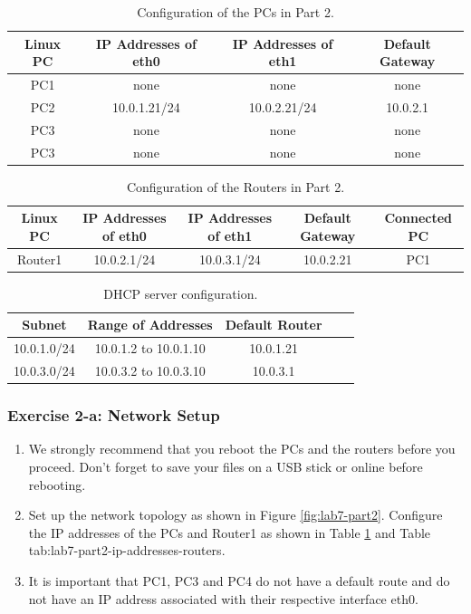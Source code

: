 \begin{table}[h!t]
	\centering
	\begin{tabular}{| c | c | c | c |}	
		\hline
		\textbf{Linux PC} & \textbf{IP Addresses of eth0} & \textbf{IP Addresses of eth1} & \textbf{Default Gateway} \\ \hline
		PC1 & none & none & none \\ 
		PC2 & 10.0.1.21/24 & 10.0.2.21/24 & 10.0.2.1 \\
		PC3 & none & none & none \\ 
		PC3 & none & none & none \\ \hline
	\end{tabular}
	\caption{Configuration of the PCs in Part 2.}
	\label{tab:lab7-part2-ip-addresses-pc}
\end{table}

\begin{table}[h!t]
	\centering
	\begin{tabular}{| c | c | c | c | c |}	
		\hline
		\textbf{Linux PC} & \textbf{IP Addresses of eth0} & \textbf{IP Addresses of eth1} & \textbf{Default Gateway} & \textbf{Connected PC} \\ \hline
Router1 & 10.0.2.1/24 & 10.0.3.1/24 & 10.0.2.21 & PC1 \\ \hline
	\end{tabular}
	\caption{Configuration of the Routers in Part 2.}
	\label{tab:lab7-part2-ip-addresses-routers}
\end{table}

\begin{table}[h!t]
	\centering
	\begin{tabular}{| c | c | c | c | c |}	
		\hline
		\textbf{Subnet} & \textbf{Range of Addresses} & \textbf{Default Router} \\ \hline
		10.0.1.0/24 & 10.0.1.2 to 10.0.1.10 & 10.0.1.21 \\ 
		10.0.3.0/24 & 10.0.3.2 to 10.0.3.10 & 10.0.3.1 \\ \hline
	\end{tabular}
	\caption{DHCP server configuration.}
	\label{tab:lab7-part2-dhcp}
\end{table}

\subsubsection{Exercise 2-a: Network Setup}
\begin{enumerate}
	\item We strongly recommend that you reboot the PCs and the routers before you proceed. Don't forget to save your files on a USB stick or online before rebooting.
	\item Set up the network topology as shown in Figure \ref{fig:lab7-part2}. Configure the IP addresses of the PCs and Router1 as shown in Table \ref{tab:lab7-part2-ip-addresses-pc} and Table {tab:lab7-part2-ip-addresses-routers}.
	\item It is important that PC1, PC3 and PC4 do not have a default route and do not have an IP address associated with their respective interface eth0.
\end{enumerate}


